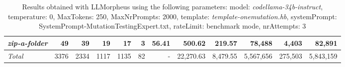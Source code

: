 \begin{table*}
{\begin{tabular}{l||r|r|r|r|r|r||r|r||r|r|r}
   \hline
   \textit{zip-a-folder} & 49 & 39 & 19 & 17 & 3 & 56.41 & 500.62 & 219.57 & 78,488 & 4,403 & 82,891 \\ 
   \hline
   \textit{Total} & 3376 & 2334 & 1117 & 1135 & 82 & - & 22,270.63  & 8,479.55 & 5,567,656 & 275,503 & 5,843,159 \\ 
 \end{tabular}
 }
 \caption{Results obtained with LLMorpheus using the following parameters: 
   model: \textit{codellama-34b-instruct}, 
   temperature: 0, 
   MaxTokens: 250, 
   MaxNrPrompts: 2000, 
   template: \textit{template-onemutation.hb}, 
   systemPrompt: SystemPrompt-MutationTestingExpert.txt, 
   rateLimit: benchmark mode, 
   nrAttempts: 3  
 }
\end{table*}

